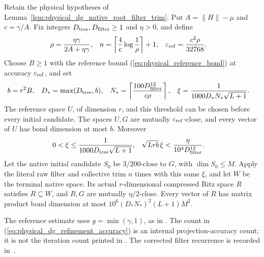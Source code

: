 \begin{lemma}
    \label{lem:physical_dg_automatic_refinement}
    \leanok
    Retain the physical hypotheses of
    Lemma~\ref{lem:physical_dg_native_root_filter_trim}. Put
    $A=\|H\|-\mu$ and $c=\gamma/A$. Fix integers
    $D_{\rm tree},D_{\rm filter}\ge1$ and $\eta>0$, and define
    \begin{align}
        \rho                  & =\frac{\eta\gamma}{2A+\eta\gamma},               &
        n                     & =\left\lceil\frac4c\log\frac1\rho\right\rceil+1, &
        \varepsilon_{\rm ref} & =\frac{c^2\rho}{32768}.
        \label{eq:physical_dg_refinement_accuracy}
    \end{align}
    Choose $B\ge1$ with the reference bound
    (\ref{eq:physical_reference_bond}) at accuracy
    $\varepsilon_{\rm ref}$, and set
    \begin{align}
        b   & =r^2B,                                                        & D_* & =\max(D_{\rm tree},b), &
        N_* & =\left\lceil\frac{100D_{\rm filter}^{12}}{c\rho}\right\rceil, &
        \xi & =\frac1{1000D_*N_*\sqrt{L+1}}.
        \label{eq:physical_dg_refinement_threshold}
    \end{align}
    The reference space $U$, of dimension $r$, and this threshold can be
    chosen before every initial candidate. The spaces $U,G$ are mutually
    $\varepsilon_{\rm ref}$-close, and every vector of $U$ has bond
    dimension at most $b$. Moreover
    \begin{align}
        0<\xi           & \le\frac1{1000D_{\rm tree}\sqrt{L+1}}, &
        \sqrt{Lrb}\,\xi & <\frac{\eta}{10^4D_{\rm filter}^{12}}.
        \label{eq:physical_dg_refinement_threshold_bounds}
    \end{align}
    Let the native initial candidate $S_0$ be $3/200$-close to $G$, with
    $\dim S_0\le M$. Apply the literal raw filter and collective trim
    $n$ times with this same $\xi$, and let $W$ be the terminal native
    space. Its actual $r$-dimensional compressed Ritz space $R$ satisfies
    $R\subseteq W$, and $R,G$ are mutually $\eta/2$-close.
    Every vector of $R$ has matrix product bond dimension at most
    $10^6(D_*N_*)^2(L+1)M^2$.

    The reference estimate uses $g=\min(\gamma,1)$, as in
    \cite{gap:alvv16_approximation_parameters}. The count in
    (\ref{eq:physical_dg_refinement_accuracy}) is an internal
    projection-accuracy count; it is not the iteration count printed in
    \cite[lines 1809--1817]{Arad2016RigorousRG}. The corrected filter
    recurrence is recorded in~\cite{gap:alvv16_final_filter_gain}.
\end{lemma}
